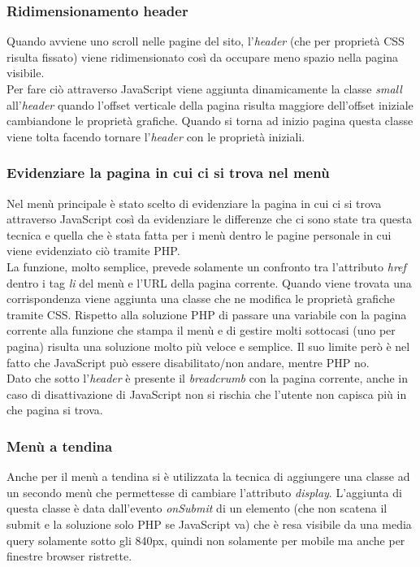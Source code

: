 		\subsubsection{Ridimensionamento header}
		Quando avviene uno scroll nelle pagine del sito, l'\emph{header} (che per proprietà CSS risulta fissato) viene ridimensionato così da occupare meno spazio nella pagina visibile. \\
		Per fare ciò attraverso JavaScript viene aggiunta dinamicamente la classe \emph{small} all'\emph{header} quando l'offset verticale della pagina risulta maggiore dell'offset iniziale cambiandone le proprietà grafiche.
		Quando si torna ad inizio pagina questa classe viene tolta facendo tornare l'\emph{header} con le proprietà iniziali.
		
		\subsubsection{Evidenziare  la pagina in cui ci si trova nel menù}
		Nel menù principale è stato scelto di evidenziare la pagina in cui ci si trova attraverso JavaScript così da evidenziare le differenze che ci sono state tra questa tecnica e quella che è stata fatta per i menù dentro le pagine personale in cui viene evidenziato ciò tramite PHP.\\
		La funzione, molto semplice, prevede solamente un confronto tra l'attributo \emph{href} dentro i tag \emph{li} del menù e l'URL della pagina corrente. Quando viene trovata una corrispondenza viene aggiunta una classe che ne modifica le proprietà grafiche tramite CSS.
		Rispetto alla soluzione PHP di passare una variabile con la pagina corrente alla funzione che stampa il menù e di gestire molti sottocasi (uno per pagina) risulta una soluzione molto più veloce e semplice. Il suo limite però è nel fatto che JavaScript può essere disabilitato/non andare, mentre PHP no.\\
		Dato che sotto l'\emph{header} è presente il \emph{breadcrumb} con la pagina corrente, anche in caso di disattivazione di JavaScript non si rischia che l'utente non capisca più in che pagina si trova.
		
		\subsubsection{Menù a tendina}
		Anche per il menù a tendina si è utilizzata la tecnica di aggiungere una classe ad un secondo menù che permettesse di cambiare l'attributo \emph{display}. L'aggiunta di questa classe è data dall'evento \emph{onSubmit} di un elemento (che non scatena il submit e la soluzione solo PHP se JavaScript va) che è resa visibile da una media query solamente sotto gli 840px, quindi non solamente per mobile ma anche per finestre browser ristrette.
		

		


